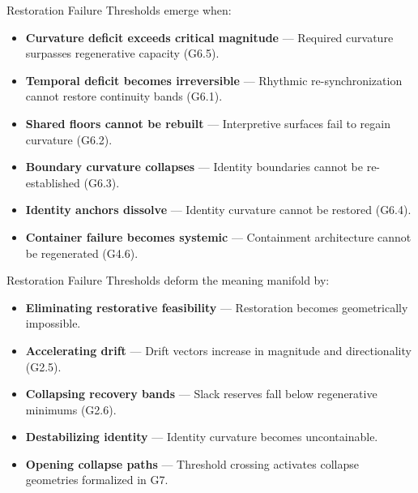 \medskip

\noindent Restoration Failure Thresholds emerge when:

\begin{itemize}[leftmargin=1.2cm]
    \item \textbf{Curvature deficit exceeds critical magnitude} — Required
    curvature surpasses regenerative capacity (G6.5).

    \item \textbf{Temporal deficit becomes irreversible} — Rhythmic
    re-synchronization cannot restore continuity bands (G6.1).

    \item \textbf{Shared floors cannot be rebuilt} — Interpretive surfaces fail
    to regain curvature (G6.2).

    \item \textbf{Boundary curvature collapses} — Identity boundaries cannot be
    re-established (G6.3).

    \item \textbf{Identity anchors dissolve} — Identity curvature cannot be
    restored (G6.4).

    \item \textbf{Container failure becomes systemic} — Containment architecture
    cannot be regenerated (G4.6).
\end{itemize}

\medskip

\noindent Restoration Failure Thresholds deform the meaning manifold by:

\begin{itemize}[leftmargin=1.2cm]
    \item \textbf{Eliminating restorative feasibility} — Restoration becomes
    geometrically impossible.

    \item \textbf{Accelerating drift} — Drift vectors increase in magnitude and
    directionality (G2.5).

    \item \textbf{Collapsing recovery bands} — Slack reserves fall below
    regenerative minimums (G2.6).

    \item \textbf{Destabilizing identity} — Identity curvature becomes
    uncontainable.

    \item \textbf{Opening collapse paths} — Threshold crossing activates collapse
    geometries formalized in G7.
\end{itemize}

